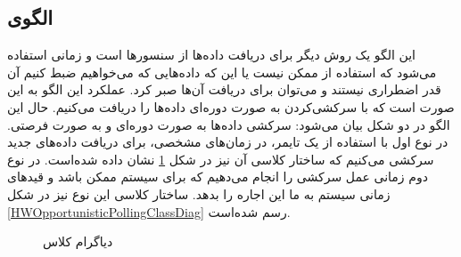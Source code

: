 \subsection{الگوی }
\label{HWPollingSec}
\begin{RTL}
این الگو یک روش دیگر برای دریافت داده‌ها از سنسورها است و زمانی استفاده می‌شود که
استفاده از  ممکن نیست یا این که
داده‌هایی که می‌خواهیم ضبط کنیم آن قدر اضطراری نیستند و می‌توان برای دریافت آن‌ها
صبر کرد. عملکرد این الگو به این صورت است که با سرکشی‌کردن به صورت دوره‌ای داده‌ها
را دریافت می‌کنیم. حال این الگو در دو شکل بیان می‌شود: سرکشی داده‌ها به صورت
دوره‌ای و به صورت فرصتی.
در نوع اول با استفاده از یک تایمر، در زمان‌های مشخصی، برای دریافت داده‌های جدید
سرکشی می‌کنیم که ساختار کلاسی آن نیز
در شکل \ref{HWPeriodicPollingClassDiag} نشان داده شده‌است.
در نوع دوم زمانی عمل سرکشی را انجام می‌دهیم که برای سیستم ممکن باشد و
قیدهای زمانی سیستم به ما این اجاره را بدهد. ساختار کلاسی این نوع نیز در شکل
\ref{HWOpportunisticPollingClassDiag} رسم شده‌است.
\end{RTL}
\begin{figure}[h!]
\centering
{}
\caption{دیاگرام کلاس }
\label{HWPeriodicPollingClassDiag}
\end{figure}

